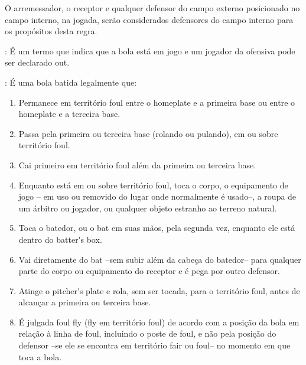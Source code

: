 \begin{description}
	O arremessador, o receptor e qualquer defensor do campo externo posicionado no campo interno, na jogada, ser\~ao considerados defensores do campo interno para os prop\'ositos desta regra. 
	
	\item[Bola em risco]:
	\'E um termo que indica que a bola est\'a em jogo e um jogador da ofensiva pode ser declarado \gls{out}. 

	\item[Bola \gls{foul}]: \'E uma bola batida legalmente que: 

	\begin{enumerate}[label=\alph*)]
		\item Permanece em territ\'orio \gls{foul} entre o \gls{homeplate} e a primeira base ou entre o \gls{homeplate} e a terceira base. 
		
		\item  Passa pela primeira ou terceira base (rolando ou pulando), em ou sobre territ\'orio \gls{foul}. 
		
		\item  Cai primeiro em territ\'orio \gls{foul} al\'em da primeira ou terceira base. 
		
		\item  Enquanto est\'a em ou sobre territ\'orio \gls{foul}, toca o corpo, o equipamento de jogo – em uso ou removido do lugar onde normalmente \'e usado–, a roupa de um \'arbitro ou jogador, ou qualquer objeto estranho ao terreno natural. 
		
		\item  Toca o batedor, ou o \gls{bat} em suas m\~aos, pela segunda vez, enquanto ele est\'a dentro do \gls{batter's box}.
		\item Vai diretamente do \gls{bat} –sem subir al\'em da cabe\c{c}a do batedor– para qualquer parte do corpo ou equipamento do receptor e \'e pega por outro defensor. 
		
		\item  Atinge o \gls{pitcher's plate} e rola, sem ser tocada, para o territ\'orio \gls{foul}, antes de alcan\c{c}ar a primeira ou terceira base. 
		
		\item  \'E julgada \gls{foul fly} (\gls{fly} em territ\'orio \gls{foul}) de acordo com a posi\c{c}\~ao da bola em rela\c{c}\~ao \`a linha de \gls{foul}, incluindo o poste de \gls{foul}, e n\~ao pela posi\c{c}\~ao do defensor –se ele se encontra em territ\'orio \gls{fair} ou \gls{foul}– no momento em que toca a bola. 
		

\end{enumerate}
\end{description}
